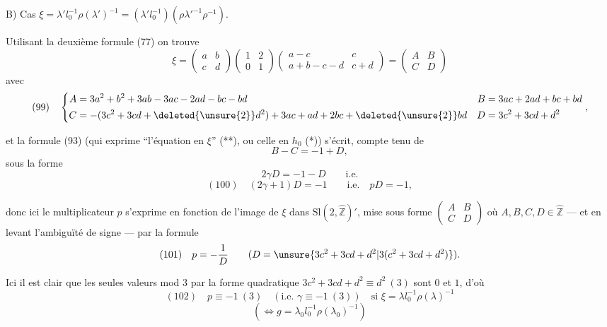 B) Cas $\xi=\lambda'l_0^{-1}\rho(\lambda')^{-1}=(\lambda'l_0^{-1})(\rho\lambda'^{-1}\rho^{-1})$.

Utilisant la deuxième formule (77) on trouve
\[
\xi=\begin{pmatrix}a&b\\c&d\end{pmatrix}
\begin{pmatrix}1&2\\0&1\end{pmatrix}
\begin{pmatrix}a-c&c\\a+b-c-d&c+d\end{pmatrix}
=\begin{pmatrix}A&B\\C&D\end{pmatrix}
\]
avec
\[
(99)\quad
\left\{\begin{aligned}
A&=3a^2+b^2+3ab-3ac-2ad-bc-bd
& B&=3ac+2ad+bc+bd\\
C&=-(3c^2+3cd+\deleted{\unsure{2}}d^2)+3ac+ad+2bc+\deleted{\unsure{2}}bd
& D&=3c^2+3cd+d^2
\end{aligned}\right.,
\]

et la formule (93) (qui exprime ``l'équation en $\xi$'' (**), ou celle en $h_0$ (*)) s'écrit,  compte tenu de
\[
B-C=-1+D,
\]
sous la forme \deleted{\unsure{$2\gamma$}}
\[
2\gamma D=-1-D\qquad\text{i.e.}
\]
\[
(100)\quad \boxed{(2\gamma+1)D=-1\qquad\text{i.e.}\quad pD=-1},
\]

donc ici le multiplicateur $p$ s'exprime en fonction de l'image de $\xi$ dans $\mathrm{Sl}(2,\widehat{\mathbb Z})'$, mise sous forme $\begin{pmatrix}A&B\\C&D\end{pmatrix}$ où $A,B,C,D\in\widehat{\mathbb Z}$ --- et en levant l'ambiguïté de signe  --- par la formule
\[
(101)\quad p=-\frac1D\qquad(D=\unsure{3c^2+3cd+d^2|3(c^2+3cd+d^2)}).
\]


Ici il est clair que les seules valeurs mod $3$  par la forme quadratique $3c^2+3cd+d^2\equiv d^2\ (3)$ sont $0$ et $1$, d'où
\[
(102)\quad p\equiv-1\ (3)\quad(\text{i.e. }\gamma\equiv-1\ (3))\quad\text{si }\xi=\lambda l_0^{-1}\rho(\lambda)^{-1}
\]
\[
(\Longleftrightarrow g=\lambda_0l_0^{-1}\rho(\lambda_0)^{-1})
\]

